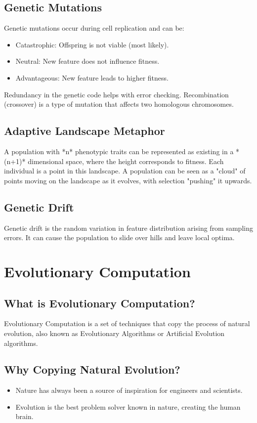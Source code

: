 \subsection*{Genetic Mutations}
Genetic mutations occur during cell replication and can be:
\begin{itemize}
    \item Catastrophic: Offspring is not viable (most likely).
    \item Neutral: New feature does not influence fitness.
    \item Advantageous: New feature leads to higher fitness.
\end{itemize}
Redundancy in the genetic code helps with error checking. Recombination (crossover) is a type of mutation that affects two homologous chromosomes.

\subsection*{Adaptive Landscape Metaphor}
A population with *n* phenotypic traits can be represented as existing in a *(n+1)* dimensional space, where the height corresponds to fitness. Each individual is a point in this landscape. A population can be seen as a "cloud" of points moving on the landscape as it evolves, with selection "pushing" it upwards.

\subsection*{Genetic Drift}
Genetic drift is the random variation in feature distribution arising from sampling errors. It can cause the population to slide over hills and leave local optima.

\section{Evolutionary Computation}
\subsection*{What is Evolutionary Computation?}
Evolutionary Computation is a set of techniques that copy the process of natural evolution, also known as Evolutionary Algorithms or Artificial Evolution algorithms.

\subsection*{Why Copying Natural Evolution?}
\begin{itemize}
    \item Nature has always been a source of inspiration for engineers and scientists.
    \item Evolution is the best problem solver known in nature, creating the human brain.
\end{itemize}

